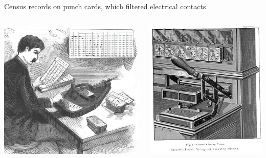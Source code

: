 \documentclass[aspectratio=169]{beamer}
\begin{document}
\begin{frame}{Census records on punch cards, which filtered electrical contacts}
\vspace{0.17 cm}
\begin{columns}
\includegraphics[width=\linewidth]{1890_Census_Hollerith_Pantograph_Punching_Machine_Sci_Amer.jpg}

\includegraphics[width=\linewidth]{1890_Hollerith_Circuit-Closing_Press_OM.jpg}
\end{columns}
\end{frame}
\end{document}
